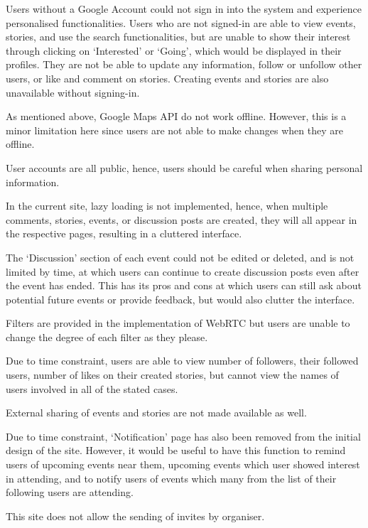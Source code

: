 \documentclass[11pt, a4paper]{article}
\begin{document}
\begin{enumerate*}[label=\textbf{\arabic*})]
\item Users without a Google Account could not sign in into the system and experience personalised
functionalities. Users who are not signed-in are able to view events, stories, and use the search
functionalities, but are unable to show their interest through clicking on `Interested' or `Going',
which would be displayed in their profiles. They are not be able to update any information, follow
or unfollow other users, or like and comment on stories. Creating events and stories are also
unavailable without signing-in.
\item As mentioned above, Google Maps API do not work offline. However, this is a minor limitation
here since users are not able to make changes when they are offline.
\item User accounts are all public, hence, users should be careful when sharing personal
information.
\item In the current site, lazy loading is not implemented, hence, when multiple comments, stories,
events, or discussion posts are created, they will all appear in the respective pages, resulting in
a cluttered interface.
\item The `Discussion' section of each event could not be edited or deleted, and is not limited by
time, at which users can continue to create discussion posts even after the event has ended. This
has its pros and cons at which users can still ask about potential future events or provide
feedback, but would also clutter the interface.
\item Filters are provided in the implementation of WebRTC but users are unable to change the degree
of each filter as they please.
\item Due to time constraint, users are able to view number of followers, their followed users,
number of likes on their created stories, but cannot view the names of users involved in all of the
stated cases.
\item External sharing of events and stories are not made available as well.
\item Due to time constraint, `Notification' page has also been removed from the initial design of
the site. However, it would be useful to have this function to remind users of upcoming events near
them, upcoming events which user showed interest in attending, and to notify users of events which
many from the list of their following users are attending.
\item This site does not allow the sending of invites by organiser.

\end{enumerate*}
\end{document}
